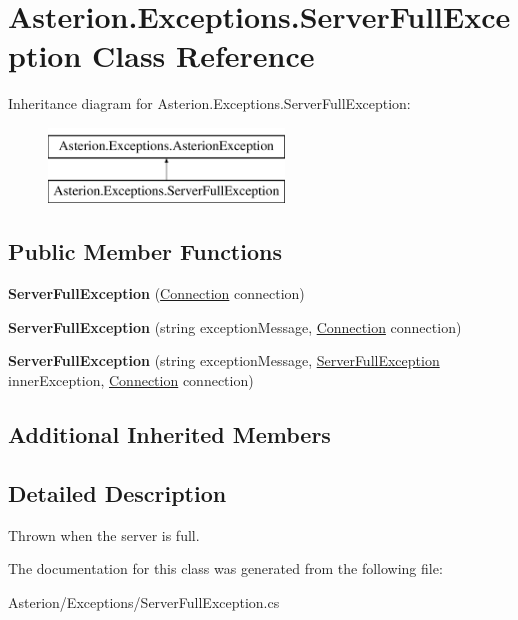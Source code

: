 \hypertarget{classAsterion_1_1Exceptions_1_1ServerFullException}{\section{Asterion.\-Exceptions.\-Server\-Full\-Exception Class Reference}
\label{classAsterion_1_1Exceptions_1_1ServerFullException}
}
Inheritance diagram for Asterion.\-Exceptions.\-Server\-Full\-Exception\-:\begin{figure}[H]
\begin{center}
\leavevmode
\includegraphics[height=2.000000cm]{classAsterion_1_1Exceptions_1_1ServerFullException}
\end{center}
\end{figure}
\subsection*{Public Member Functions}
\begin{DoxyCompactItemize}
\item 
\hypertarget{classAsterion_1_1Exceptions_1_1ServerFullException_a17aca9139bf6df001275d86eeae2decb}{{\bfseries Server\-Full\-Exception} (\hyperlink{classAsterion_1_1Connection}{Connection} connection)}\label{classAsterion_1_1Exceptions_1_1ServerFullException_a17aca9139bf6df001275d86eeae2decb}

\item 
\hypertarget{classAsterion_1_1Exceptions_1_1ServerFullException_a9e308eb71d28224c248e747ddd35d18d}{{\bfseries Server\-Full\-Exception} (string exception\-Message, \hyperlink{classAsterion_1_1Connection}{Connection} connection)}\label{classAsterion_1_1Exceptions_1_1ServerFullException_a9e308eb71d28224c248e747ddd35d18d}

\item 
\hypertarget{classAsterion_1_1Exceptions_1_1ServerFullException_a922b487e7806e0090d4ba5118d2a1b00}{{\bfseries Server\-Full\-Exception} (string exception\-Message, \hyperlink{classAsterion_1_1Exceptions_1_1ServerFullException}{Server\-Full\-Exception} inner\-Exception, \hyperlink{classAsterion_1_1Connection}{Connection} connection)}\label{classAsterion_1_1Exceptions_1_1ServerFullException_a922b487e7806e0090d4ba5118d2a1b00}

\end{DoxyCompactItemize}
\subsection*{Additional Inherited Members}


\subsection{Detailed Description}
Thrown when the server is full. 

The documentation for this class was generated from the following file\-:\begin{DoxyCompactItemize}
\item 
Asterion/\-Exceptions/Server\-Full\-Exception.\-cs\end{DoxyCompactItemize}
